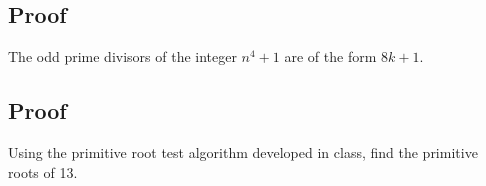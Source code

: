 \documentclass{article}
\begin{document}
\subsection{Proof}
The odd prime divisors of the integer $n^4 +1$ are of the form $8k + 1$.  

\subsection{Proof}
Using the primitive root test algorithm developed in class, find the primitive roots of 13.
\end{document}
